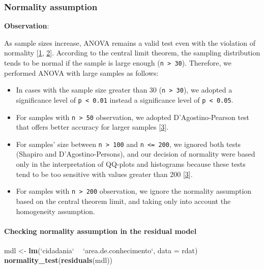 \documentclass[]{article}
\newenvironment{Shaded}{\begin{snugshade}}{\end{snugshade}}
\newcommand{\DataTypeTok}[1]{\textcolor[rgb]{0.13,0.29,0.53}{#1}}
\newcommand{\KeywordTok}[1]{\textcolor[rgb]{0.13,0.29,0.53}{\textbf{#1}}}
\newcommand{\NormalTok}[1]{#1}
\newcommand{\OperatorTok}[1]{\textcolor[rgb]{0.81,0.36,0.00}{\textbf{#1}}}
\newcommand{\StringTok}[1]{\textcolor[rgb]{0.31,0.60,0.02}{#1}}
\let\oldparagraph\paragraph
\renewcommand{\paragraph}[1]{\oldparagraph{#1}\mbox{}}
\begin{document}
\hypertarget{normality-assumption}{%
\subsubsection{Normality assumption}\label{normality-assumption}}

\textbf{Observation}:

As sample sizes increase, ANOVA remains a valid test even with the
violation of normality {[}\protect\hyperlink{references}{1},
\protect\hyperlink{references}{2}{]}. According to the central limit
theorem, the sampling distribution tends to be normal if the sample is
large enough (\texttt{n\ \textgreater{}\ 30}). Therefore, we performed
ANOVA with large samples as follows:

\begin{itemize}
\item
  In cases with the sample size greater than 30
  (\texttt{n\ \textgreater{}\ 30}), we adopted a significance level of
  \texttt{p\ \textless{}\ 0.01} instead a significance level of
  \texttt{p\ \textless{}\ 0.05}.
\item
  For samples with \texttt{n\ \textgreater{}\ 50} observation, we
  adopted D'Agostino-Pearson test that offers better accuracy for larger
  samples {[}\protect\hyperlink{references}{3}{]}.
\item
  For samples' size between \texttt{n\ \textgreater{}\ 100} and
  \texttt{n\ \textless{}=\ 200}, we ignored both tests (Shapiro and
  D'Agostino-Persons), and our decision of normality were based only in
  the interpretation of QQ-plots and histograms because these tests tend
  to be too sensitive with values greater than 200
  {[}\protect\hyperlink{references}{3}{]}.
\item
  For samples with \texttt{n\ \textgreater{}\ 200} observation, we
  ignore the normality assumption based on the central theorem limit,
  and taking only into account the homogeneity assumption.
\end{itemize}

\hypertarget{checking-normality-assumption-in-the-residual-model}{%
\paragraph{Checking normality assumption in the residual
model}\label{checking-normality-assumption-in-the-residual-model}}

\begin{Shaded}
\begin{Highlighting}[]
\NormalTok{mdl <-}\StringTok{ }\KeywordTok{lm}\NormalTok{(}\StringTok{`}\DataTypeTok{cidadania}\StringTok{`} \OperatorTok{~}\StringTok{ `}\DataTypeTok{area.de.conhecimento}\StringTok{`}\NormalTok{, }\DataTypeTok{data =}\NormalTok{ rdat)}
\KeywordTok{normality_test}\NormalTok{(}\KeywordTok{residuals}\NormalTok{(mdl))}
\end{Highlighting}
\end{Shaded}
\end{document}
